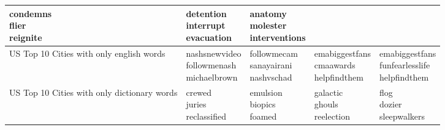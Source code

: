 \documentclass[11pt, oneside]{article}
\makeatletter
\newcommand{\specialcell}[2][c]{%
  \begin{tabular}[#1]{@{}c@{}}#2\end{tabular}}
\makeatother
\begin{document}
\begin{enumerate}
\begin{tabularx}{\textwidth}{X|l|l|l|l}
\specialcell{condemns\\flier\\reignite} & 
\specialcell{detention\\interrupt\\evacuation} & 
\specialcell{anatomy\\molester\\interventions} \\ 
\hline US Top 10 Cities with only english words & 
\specialcell{nashsnewvideo\\followmenash\\michaelbrown} & 
\specialcell{followmecam\\sanayairani\\nashvschad} & 
\specialcell{emabiggestfans\\cmaawards\\helpfindthem} & 
\specialcell{emabiggestfans\\funfearlesslife\\helpfindthem} \\ 
\hline US Top 10 Cities with only dictionary words & 
\specialcell{crewed\\juries\\reclassified} & 
\specialcell{emulsion\\biopics\\foamed} & 
\specialcell{galactic\\ghouls\\reelection} & 
\specialcell{flog\\dozier\\sleepwalkers} \\ 
\hline \end{tabularx}


\end{enumerate}
\end{document}
